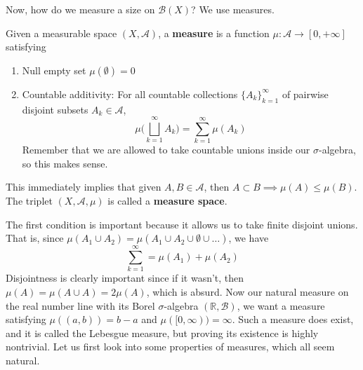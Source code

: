   Now, how do we measure a size on $\mathcal{B}(X)$? We use measures. 

  \begin{definition}[Measure]
    Given a measurable space $(X, \mathcal{A})$, a \textbf{measure} is a function $\mu : \mathcal{A} \longrightarrow [0, +\infty]$ satisfying 
    \begin{enumerate}
      \item Null empty set $\mu(\emptyset) = 0$ 
      \item Countable additivity: For all countable collections $\{A_k\}_{k=1}^\infty$ of pairwise disjoint subsets $A_k \in \mathcal{A}$, 
      \begin{equation}
        \mu \bigg( \bigsqcup_{k=1}^\infty A_k \bigg) = \sum_{k=1}^\infty \mu(A_k)
      \end{equation}
      Remember that we are allowed to take countable unions inside our $\sigma$-algebra, so this makes sense. 
    \end{enumerate}
    This immediately implies that given $A, B \in \mathcal{A}$, then $A \subset B \implies \mu(A) \leq \mu(B)$. The triplet $(X, \mathcal{A}, \mu)$ is called a \textbf{measure space}. 
  \end{definition}

  The first condition is important because it allows us to take finite disjoint unions. That is, since $\mu(A_1 \cup A_2) = \mu(A_1 \cup A_2 \cup \emptyset \cup \ldots)$, we have 
  \begin{equation}
    \sum_{k=1}^\infty = \mu(A_1) + \mu(A_2)
  \end{equation}
  Disjointness is clearly important since if it wasn't, then $\mu(A) = \mu(A \cup A) = 2 \mu(A)$, which is absurd. Now our natural measure on the real number line with its Borel $\sigma$-algebra $(\mathbb{R}, \mathcal{B})$, we want a measure satisfying $\mu((a, b)) = b - a$ and $\mu([0, \infty)) = \infty$. Such a measure does exist, and it is called the Lebesgue measure, but proving its existence is highly nontrivial. Let us first look into some properties of measures, which all seem natural. 

